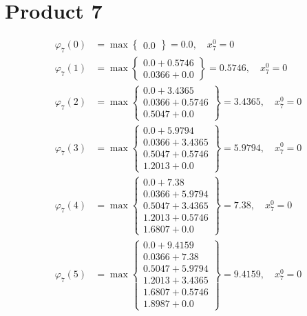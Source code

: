 \documentclass{article}
\begin{document}
\section{Product 7}
\begin{align*}
\varphi_{7}(0) &= \max \left\{ \begin{array}{c}
0.0
\end{array} \right\}=0.0, \quad x_{7}^0=0\\
  
\varphi_{7}(1) &= \max \left\{ \begin{array}{c}
0.0 + 0.5746 \\
 0.0366 + 0.0
\end{array} \right\}=0.5746, \quad x_{7}^0=0\\
  
\varphi_{7}(2) &= \max \left\{ \begin{array}{c}
0.0 + 3.4365 \\
 0.0366 + 0.5746 \\
 0.5047 + 0.0
\end{array} \right\}=3.4365, \quad x_{7}^0=0\\
  
\varphi_{7}(3) &= \max \left\{ \begin{array}{c}
0.0 + 5.9794 \\
 0.0366 + 3.4365 \\
 0.5047 + 0.5746 \\
 1.2013 + 0.0
\end{array} \right\}=5.9794, \quad x_{7}^0=0\\
  
\varphi_{7}(4) &= \max \left\{ \begin{array}{c}
0.0 + 7.38 \\
 0.0366 + 5.9794 \\
 0.5047 + 3.4365 \\
 1.2013 + 0.5746 \\
 1.6807 + 0.0
\end{array} \right\}=7.38, \quad x_{7}^0=0\\
  
\varphi_{7}(5) &= \max \left\{ \begin{array}{c}
0.0 + 9.4159 \\
 0.0366 + 7.38 \\
 0.5047 + 5.9794 \\
 1.2013 + 3.4365 \\
 1.6807 + 0.5746 \\
 1.8987 + 0.0
\end{array} \right\}=9.4159, \quad x_{7}^0=0\\
  

\end{align*}
\end{document}
